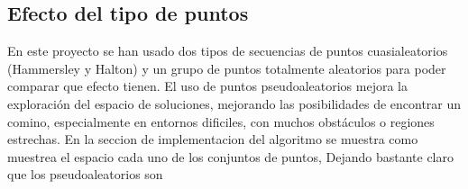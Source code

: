 \subsection{Efecto del tipo de puntos}

En este proyecto se han usado dos tipos de secuencias de puntos cuasialeatorios (Hammersley y Halton) y un grupo de puntos totalmente aleatorios para poder comparar que efecto tienen. El uso de puntos pseudoaleatorios mejora la exploración del espacio de soluciones, mejorando las posibilidades de encontrar un comino, especialmente en entornos dificiles, con muchos obstáculos o regiones estrechas. En la seccion de implementacion del algoritmo se muestra como muestrea el espacio cada uno de los conjuntos de puntos, Dejando bastante claro que los pseudoaleatorios son      